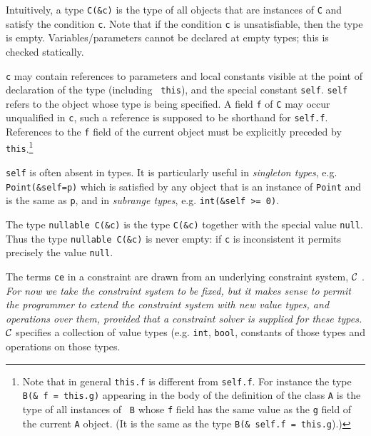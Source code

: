 \documentclass{article}
\begin{document}
Intuitively, a type {\tt C(\&c)} is the type of all objects that are
instances of {\tt C} and satisfy the condition {\tt c}. Note that if
the condition {\tt c} is unsatisfiable, then the type is
empty. Variables/parameters cannot be declared at empty types; this is
checked statically.

{\tt c} may contain references to parameters and local constants
visible at the point of declaration of the type (including {\tt
this}), and the special constant {\tt self}.  {\tt self} refers to the
object whose type is being specified. A field {\tt f} of {\tt C} may
occur unqualified in {\tt c}, such a reference is supposed to be
shorthand for {\tt self.f}. References to the {\tt f} field of the
current object must be explicitly preceded by {\tt this}.\footnote{
Note that in general {\tt this.f} is different from {\tt self.f}.  For
instance the type {\tt B(\& f = this.g)} appearing in the body of the
definition of the class {\tt A} is the type of all instances of {\tt
B} whose {\tt f} field has the same value as the {\tt g} field of the
current {\tt A} object. (It is the same as the type {\tt B(\& self.f =
this.g}).)}

{\tt self} is often absent in types. It is particularly useful in {\em
singleton types}, e.g. {\tt Point(\&self=p)} which is satisfied by any
object that is an instance of {\tt Point} and is the same as {\tt p},
and in {\em subrange types}, e.g. {\tt int(\&self >= 0)}.


The type {\tt nullable C(\&c)} is the type {\tt C(\&c)} together with
the special value {\tt null}. Thus the type {\tt nullable C(\&c)} is
never empty: if {\tt c} is inconsistent it permits precisely the value
{\tt null}.

The terms {\tt ce} in a constraint are drawn from an underlying
constraint system, $\cal C$ \cite{cccc}. {\em For now we take the
constraint system to be fixed, but it makes sense to permit the
programmer to extend the constraint system with new value types, and
operations over them, provided that a constraint solver is supplied
for these types.} $\cal C$ specifies a collection of value types
(e.g.{} {\tt int}, {\tt bool}, constants of those types and operations
on those types. 
\end{document}
